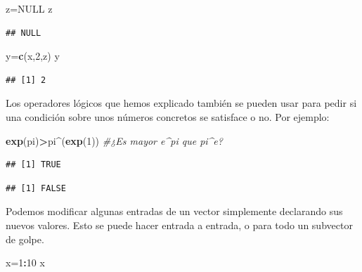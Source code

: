 \documentclass[]{book}
\newenvironment{Shaded}{\begin{snugshade}}{\end{snugshade}}
\newcommand{\CommentTok}[1]{\textcolor[rgb]{0.56,0.35,0.01}{\textit{#1}}}
\newcommand{\DecValTok}[1]{\textcolor[rgb]{0.00,0.00,0.81}{#1}}
\newcommand{\KeywordTok}[1]{\textcolor[rgb]{0.13,0.29,0.53}{\textbf{#1}}}
\newcommand{\NormalTok}[1]{#1}
\newcommand{\OperatorTok}[1]{\textcolor[rgb]{0.81,0.36,0.00}{\textbf{#1}}}
\newcommand{\OtherTok}[1]{\textcolor[rgb]{0.56,0.35,0.01}{#1}}
\theoremstyle{definition}
\theoremstyle{definition}
\theoremstyle{definition}
\theoremstyle{remark}
\begin{document}
\begin{Shaded}
\begin{Highlighting}[]
\NormalTok{z=}\OtherTok{NULL}
\NormalTok{z}
\end{Highlighting}
\end{Shaded}

\begin{verbatim}
## NULL
\end{verbatim}

\begin{Shaded}
\begin{Highlighting}[]
\NormalTok{y=}\KeywordTok{c}\NormalTok{(x,}\DecValTok{2}\NormalTok{,z)}
\NormalTok{y}
\end{Highlighting}
\end{Shaded}

\begin{verbatim}
## [1] 2
\end{verbatim}

Los operadores lógicos que hemos explicado también se pueden usar para pedir si una condición sobre unos números concretos se satisface o no. Por ejemplo:

\begin{Shaded}
\begin{Highlighting}[]
\KeywordTok{exp}\NormalTok{(pi)}\OperatorTok{>}\NormalTok{pi}\OperatorTok{^}\NormalTok{(}\KeywordTok{exp}\NormalTok{(}\DecValTok{1}\NormalTok{)) }\CommentTok{#¿Es mayor e^pi que pi^e?}
\end{Highlighting}
\end{Shaded}

\begin{verbatim}
## [1] TRUE
\end{verbatim}

\begin{Shaded}
\end{Shaded}

\begin{verbatim}
## [1] FALSE
\end{verbatim}

Podemos modificar algunas entradas de un vector simplemente declarando sus nuevos valores. Esto se puede hacer entrada a entrada, o para todo un subvector de golpe.

\begin{Shaded}
\begin{Highlighting}[]
\NormalTok{x=}\DecValTok{1}\OperatorTok{:}\DecValTok{10}
\NormalTok{x}
\end{Highlighting}
\end{Shaded}
\end{document}
